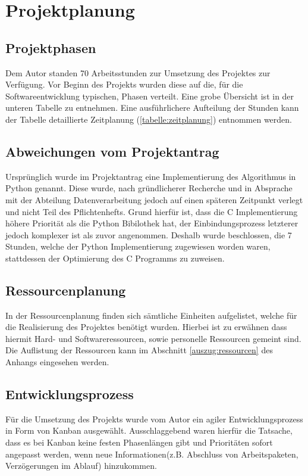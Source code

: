 \section{Projektplanung}
\label{section:projektplanung}
\subsection{Projektphasen}
Dem Autor standen 70 Arbeitsstunden zur Umsetzung des Projektes zur Verfügung.
Vor Beginn des Projekts wurden diese auf die, für die Softwareentwicklung
typischen, Phasen verteilt. Eine grobe Übersicht ist in der unteren Tabelle zu
entnehmen. Eine ausführlichere Aufteilung der Stunden kann der Tabelle
detaillierte Zeitplanung (\ref{tabelle:zeitplanung}) entnommen werden.



\subsection{Abweichungen vom Projektantrag}
Ursprünglich wurde im Projektantrag eine Implementierung des Algorithmus in
Python genannt. Diese wurde, nach gründlicherer Recherche und in Absprache mit der
Abteilung Datenverarbeitung jedoch auf einen späteren Zeitpunkt verlegt und nicht
Teil des Pflichtenhefts. Grund hierfür ist, dass die C Implementierung höhere
Priorität als die Python Bibilothek hat, der Einbindungsprozess letzterer jedoch komplexer
ist als zuvor angenommen.
Deshalb wurde beschlossen, die 7 Stunden, welche der Python Implementierung
zugewiesen worden waren, stattdessen der Optimierung des C Programms zu zuweisen.

\subsection{Ressourcenplanung}
In der Ressourcenplanung finden sich sämtliche Einheiten aufgelistet, welche für
 die Realisierung des Projektes benötigt wurden. Hierbei ist zu erwähnen dass
 hiermit Hard- und Softwareressourcen, sowie personelle Ressourcen gemeint sind.
 Die Auflistung der Ressourcen kann im Abschnitt \ref{auszug:ressourcen} des Anhangs eingesehen werden.

\subsection{Entwicklungsprozess}
Für die Umsetzung des Projekts wurde vom Autor ein agiler Entwicklungsprozess in
Form von Kanban ausgewählt. Ausschlaggebend waren hierfür die Tatsache, dass es bei Kanban
keine festen Phasenlängen gibt und Prioritäten sofort angepasst werden, wenn
neue Informationen(z.B. Abschluss von Arbeitspaketen, Verzögerungen im Ablauf) hinzukommen.\par

